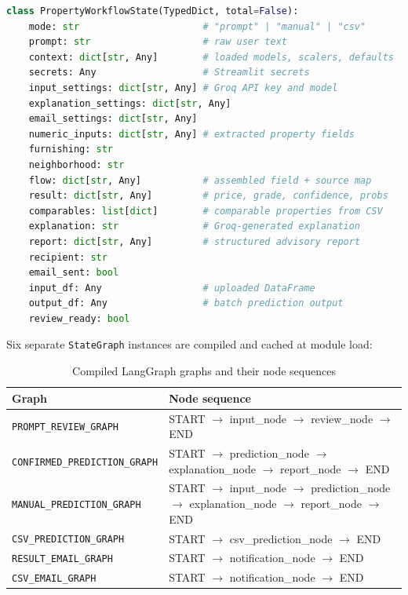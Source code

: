 \documentclass[12pt,a4paper]{article}
\begin{document}
\begin{lstlisting}[language=Python, caption={PropertyWorkflowState TypedDict definition}]
class PropertyWorkflowState(TypedDict, total=False):
    mode: str                      # "prompt" | "manual" | "csv"
    prompt: str                    # raw user text
    context: dict[str, Any]        # loaded models, scalers, defaults
    secrets: Any                   # Streamlit secrets
    input_settings: dict[str, Any] # Groq API key and model
    explanation_settings: dict[str, Any]
    email_settings: dict[str, Any]
    numeric_inputs: dict[str, Any] # extracted property fields
    furnishing: str
    neighborhood: str
    flow: dict[str, Any]           # assembled field + source map
    result: dict[str, Any]         # price, grade, confidence, probs
    comparables: list[dict]        # comparable properties from CSV
    explanation: str               # Groq-generated explanation
    report: dict[str, Any]         # structured advisory report
    recipient: str
    email_sent: bool
    input_df: Any                  # uploaded DataFrame
    output_df: Any                 # batch prediction output
    review_ready: bool
\end{lstlisting}

Six separate \texttt{StateGraph} instances are compiled and cached at module load:

\begin{table}[H]
\centering
\caption{Compiled LangGraph graphs and their node sequences}
\begin{tabularx}{\linewidth}{lX}
\toprule
\textbf{Graph} & \textbf{Node sequence} \\
\midrule
\texttt{PROMPT\_REVIEW\_GRAPH}       & START $\to$ input\_node $\to$ review\_node $\to$ END \\
\texttt{CONFIRMED\_PREDICTION\_GRAPH} & START $\to$ prediction\_node $\to$ explanation\_node $\to$ report\_node $\to$ END \\
\texttt{MANUAL\_PREDICTION\_GRAPH}   & START $\to$ input\_node $\to$ prediction\_node $\to$ explanation\_node $\to$ report\_node $\to$ END \\
\texttt{CSV\_PREDICTION\_GRAPH}      & START $\to$ csv\_prediction\_node $\to$ END \\
\texttt{RESULT\_EMAIL\_GRAPH}        & START $\to$ notification\_node $\to$ END \\
\texttt{CSV\_EMAIL\_GRAPH}           & START $\to$ notification\_node $\to$ END \\
\bottomrule
\end{tabularx}
\end{table}
\end{document}
